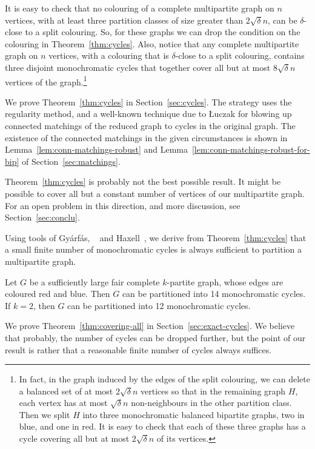 \documentclass[a4paper,10pt]{article}
\begin{document}
It is easy to check that no colouring of a complete multipartite graph on $n$ vertices, with at least three partition classes of size greater than $2\sqrt{\delta} n$, can be $\delta$-close to a split colouring.
So, for these graphs we can drop the condition on the colouring in Theorem~\ref{thm:cycles}.
Also, notice that any complete multipartite graph on $n$ vertices, with a colouring that is $\delta$-close to a split colouring, contains  three disjoint monochromatic cycles that together cover all but at most $8\sqrt \delta n$ vertices of the graph.\footnote{In fact, in the graph induced by the edges of the split colouring, we can delete a balanced set of at most $2\sqrt \delta n$ vertices so that in the remaining graph $H$, each vertex has at most $\sqrt\delta n$ non-neighbours in the other partition class. Then we split $H$ into three monochromatic balanced bipartite graphs, two in blue, and one in red. It is easy to check that
each of these three graphs has a cycle covering all but at most $2 \sqrt \delta n$ of its vertices.}

We prove Theorem~\ref{thm:cycles} in Section~\ref{sec:cycles}. The strategy uses the regularity method, and a well-known technique due to \L uczak for blowing up connected matchings of the reduced graph to cycles in the original graph. The existence of the connected matchings in the given circumstances is shown in Lemma~\ref{lem:conn-matchings-robust} and Lemma~\ref{lem:conn-matchings-robust-for-bip} of Section~\ref{sec:matchings}.

Theorem~\ref{thm:cycles} is probably not the best possible result. It might be possible to cover all but a constant number of vertices of our multipartite graph. 
For an open problem in this direction, and more discussion, see Section~\ref{sec:conclu}.

\medskip

Using tools of Gy\'{a}rf\'{a}s, ~\cite{GRSS06b} and Haxell~\cite{Hax97}, we  derive from Theorem~\ref{thm:cycles} that a small finite number of monochromatic cycles is always sufficient to partition a multipartite graph.

\begin{theorem}\label{thm:covering-all}
Let $G$ be a sufficiently large fair complete $k$-partite graph, whose edges are coloured red and blue. 
Then $G$ can be partitioned into 14 monochromatic cycles. 
If $k=2$, then $G$ can be partitioned into 12 monochromatic cycles.
\end{theorem}

We prove Theorem~\ref{thm:covering-all} in Section~\ref{sec:exact-cycles}.
We believe that probably, the number of cycles can be dropped further, but the point of our result is rather that a reasonable finite number of cycles always suffices. 
\medskip
\end{document}
